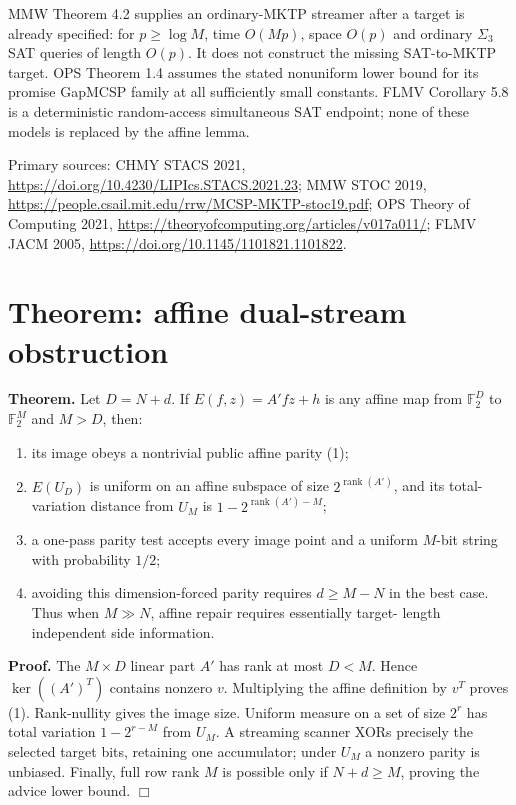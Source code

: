 \documentclass[11pt]{article}
\begin{document}
MMW Theorem 4.2 supplies an ordinary-MKTP streamer after a target is already
specified: for $p\ge\log M$, time $O(Mp)$, space $O(p)$ and ordinary
$\Sigma_3$SAT queries of length $O(p)$.  It does not construct the missing
SAT-to-MKTP target.  OPS Theorem 1.4 assumes the stated nonuniform lower bound
for its promise GapMCSP family at all sufficiently small constants.  FLMV
Corollary 5.8 is a deterministic random-access simultaneous SAT endpoint;
none of these models is replaced by the affine lemma.

Primary sources: CHMY STACS 2021,
\url{https://doi.org/10.4230/LIPIcs.STACS.2021.23}; MMW STOC 2019,
\url{https://people.csail.mit.edu/rrw/MCSP-MKTP-stoc19.pdf}; OPS Theory of
Computing 2021, \url{https://theoryofcomputing.org/articles/v017a011/}; FLMV
JACM 2005, \url{https://doi.org/10.1145/1101821.1101822}.

\section*{Theorem: affine dual-stream obstruction}
\textbf{Theorem.}  Let $D=N+d$.  If $E(f,z)=A'f\!z+h$ is any affine map from
$\mathbb F_2^D$ to $\mathbb F_2^M$ and $M>D$, then:
\begin{enumerate}
\item its image obeys a nontrivial public affine parity (1);
\item $E(U_D)$ is uniform on an affine subspace of size
      $2^{\operatorname{rank}(A')}$, and its total-variation distance from
      $U_M$ is $1-2^{\operatorname{rank}(A')-M}$;
\item a one-pass parity test accepts every image point and a uniform $M$-bit
      string with probability $1/2$;
\item avoiding this dimension-forced parity requires $d\ge M-N$ in the best
      case.  Thus when $M\gg N$, affine repair requires essentially target-
      length independent side information.
\end{enumerate}

\textbf{Proof.}  The $M\times D$ linear part $A'$ has rank at most $D<M$.
Hence $\ker((A')^T)$ contains nonzero $v$.  Multiplying the affine definition
by $v^T$ proves (1).  Rank-nullity gives the image size.  Uniform measure on a
set of size $2^r$ has total variation $1-2^{r-M}$ from $U_M$.  A streaming
scanner XORs precisely the selected target bits, retaining one accumulator;
under $U_M$ a nonzero parity is unbiased.  Finally, full row rank $M$ is
possible only if $N+d\ge M$, proving the advice lower bound. \hfill$\Box$
\end{document}
